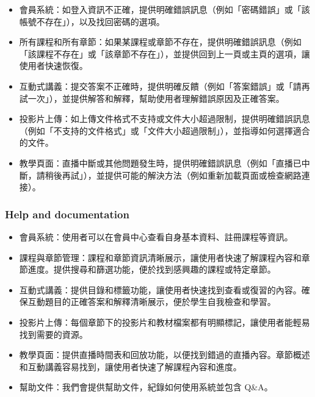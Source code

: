 \documentclass[12pt]{article}
\begin{document}
\begin{itemize}
  \item 會員系統：如登入資訊不正確，提供明確錯誤訊息（例如「密碼錯誤」或「該帳號不存在」），以及找回密碼的選項。
  \item 所有課程和所有章節：如果某課程或章節不存在，提供明確錯誤訊息（例如「該課程不存在」或「該章節不存在」），並提供回到上一頁或主頁的選項，讓使用者快速恢復。
  \item 互動式講義：提交答案不正確時，提供明確反饋（例如「答案錯誤」或「請再試一次」），並提供解答和解釋，幫助使用者理解錯誤原因及正確答案。
  \item 投影片上傳：如上傳文件格式不支持或文件大小超過限制，提供明確錯誤訊息（例如「不支持的文件格式」或「文件大小超過限制」），並指導如何選擇適合的文件。
  \item 教學頁面：直播中斷或其他問題發生時，提供明確錯誤訊息（例如「直播已中斷，請稍後再試」），並提供可能的解決方法（例如重新加載頁面或檢查網路連接）。
\end{itemize}

\subsubsection{Help and documentation}

\begin{itemize}
  \item 會員系統：使用者可以在會員中心查看自身基本資料、註冊課程等資訊。
  \item 課程與章節管理：課程和章節資訊清晰展示，讓使用者快速了解課程內容和章節進度。提供搜尋和篩選功能，便於找到感興趣的課程或特定章節。
  \item 互動式講義：提供目錄和標籤功能，讓使用者快速找到查看或復習的內容。確保互動題目的正確答案和解釋清晰展示，便於學生自我檢查和學習。
  \item 投影片上傳：每個章節下的投影片和教材檔案都有明顯標記，讓使用者能輕易找到需要的資源。
  \item 教學頁面：提供直播時間表和回放功能，以便找到錯過的直播內容。章節概述和互動講義容易找到，讓使用者快速了解課程內容和進度。
  \item 幫助文件：我們會提供幫助文件，紀錄如何使用系統並包含 Q\&A。
\end{itemize}
\end{document}
